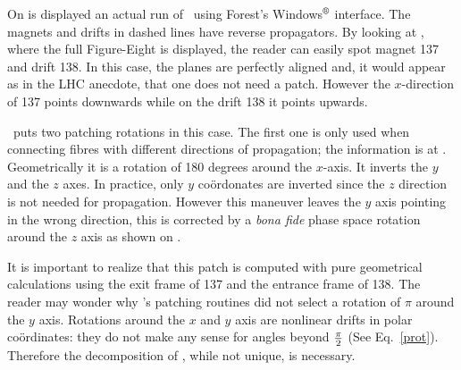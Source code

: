 On  is displayed an actual run of \PTC\ using Forest's  Windows$^\text{\textregistered}$ interface. The magnets and drifts in dashed lines have reverse propagators. By looking at , where the full Figure-Eight is displayed, the reader can easily spot magnet 137 and drift 138. In this case, the planes are perfectly aligned and, it would appear as in the LHC anecdote, that one does not need a patch. However the $x$-direction of 137 points downwards while on the drift 138 it points upwards. 

\PTC\ puts two patching rotations in this case. The first one is only used when connecting fibres with different directions of propagation; the information is at . Geometrically it is a rotation of 180 degrees around the $x$-axis. It inverts the $y$ and the $z$ axes. In practice, only $y$ co\"ordonates are inverted since the $z$ direction is not needed for propagation. However this maneuver leaves the $y$ axis pointing in the wrong direction, this is corrected by a \emph{bona fide} phase space rotation around the $z$ axis as shown on .

It is important to realize that this patch is computed with pure geometrical calculations using the exit frame of 137 and the entrance frame of 138.  The reader may wonder why \PTC 's patching routines did not select a rotation of $\pi $ around the $y$ axis. Rotations around the $x$ and $y$ axis are nonlinear drifts in polar co\"ordinates: they do not make any sense for angles beyond $\pi \over 2$ (See Eq.~\eqref{prot}). Therefore the decomposition of \PTC , while not unique, is necessary.



\endinput


